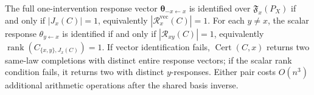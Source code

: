The full one-intervention response vector \(\boldsymbol\theta_{-x\leftarrow x}\) is identified over \(\mathfrak F_x(P_X)\) if and only if \(|J_x(C)|=1\), equivalently \(|\mathcal R_x^{\mathrm{vec}}(C)|=1\). For each \(y\ne x\), the scalar response \(\theta_{y\leftarrow x}\) is identified if and only if \(|\mathcal R_{xy}(C)|=1\), equivalently \(\operatorname{rank}(C_{\{x,y\},J_x(C)})=1\). If vector identification fails, \(\operatorname{Cert}(C,x)\) returns two same-law completions with distinct entire response vectors; if the scalar rank condition fails, it returns two with distinct \(y\)-responses. Either pair costs \(O(n^3)\) additional arithmetic operations after the shared basis inverse.